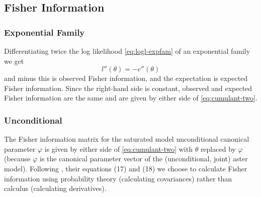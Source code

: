 \subsection{Fisher Information}

\subsubsection{Exponential Family}

Differentiating twice the log likelihood \eqref{eq:logl-expfam} of
an exponential family we get
$$
   l''(\theta) = - c''(\theta)
$$
and minus this is observed Fisher information, and the expectation is
expected Fisher information.  Since the right-hand side is constant,
observed and expected Fisher information are the same and are given by
either side of \eqref{eq:cumulant-two}.

\subsubsection{Unconditional}

The Fisher information matrix for the saturated model unconditional
canonical parameter $\varphi$ is given by either side
of \eqref{eq:cumulant-two} with $\theta$ replaced by $\varphi$ (because
$\varphi$ is the canonical parameter vector of the (unconditional, joint)
aster model).   Following \citet{aster1}, their equations (17) and (18)
we choose to calculate Fisher information using probability theory
(calculating covariances) rather than calculus (calculating derivatives).

